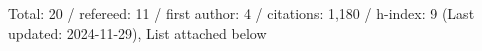 Total: 20 / refereed: 11 / first author: 4 / citations: 1,180 / h-index: 9 (Last updated: 2024-11-29), List attached below